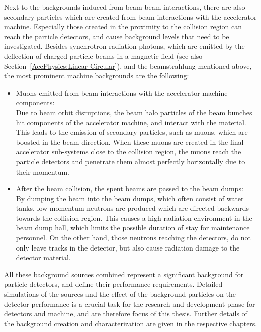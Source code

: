 Next to the backgrounds induced from beam-beam interactions, there are also secondary particles which are created from beam interactions with the accelerator machine.
Especially those created in the proximity to the collision region can reach the particle detectors, and cause background levels that need to be investigated.
Besides synchrotron radiation photons, which are emitted by the deflection of charged particle beams in a magnetic field (see also Section~\ref{AccPhysics:Linear-Circular}), and the beamstrahlung mentioned above, the most prominent machine backgrounds are the following:
\begin{itemize}
 \item Muons emitted from beam interactions with the accelerator machine components:
 \\Due to beam orbit disruptions, the beam halo particles of the beam bunches hit components of the accelerator machine, and interact with the material.
 This leads to the emission of secondary particles, such as muons, which are boosted in the beam direction.
 When these muons are created in the final accelerator sub-systems close to the collision region, the muons reach the particle detectors and penetrate them almost perfectly horizontally due to their momentum.
 \item After the beam collision, the spent beams are passed to the beam dumps:
 \\By dumping the beam into the beam dumps, which often consist of water tanks, low momentum neutrons are produced which are directed backwards towards the collision region.
 This causes a high-radiation environment in the beam dump hall, which limits the possible duration of stay for maintenance personnel.
 On the other hand, those neutrons reaching the detectors, do not only leave tracks in the detector, but also cause radiation damage to the detector material.
\end{itemize}
All these background sources combined represent a significant background for particle detectors, and define their performance requirements.
Detailed simulations of the sources and the effect of the background particles on the detector performance is a crucial task for the research and development phase for detectors and machine,
and are therefore focus of this thesis.
Further details of the background creation and characterization are given in the respective chapters.